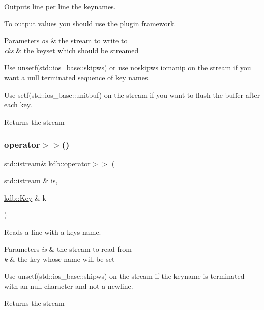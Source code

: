 Outputs line per line the keynames. 

To output values you should use the plugin framework.


\begin{DoxyParams}{Parameters}
{\em os} & the stream to write to \\
\hline
{\em cks} & the keyset which should be streamed\\
\hline
\end{DoxyParams}
Use unsetf(std\+::ios\+\_\+base\+::skipws) or use noskipws iomanip on the stream if you want a null terminated sequence of key names.

Use setf(std\+::ios\+\_\+base\+::unitbuf) on the stream if you want to flush the buffer after each key.

\begin{DoxyReturn}{Returns}
the stream 
\end{DoxyReturn}
\mbox{\label{namespacekdb_a66342865d6cdbb19075f52d92e7a61b1}} 
\subsubsection{\texorpdfstring{operator$>$$>$()}{operator>>()}\hspace{0.1cm}{\footnotesize\ttfamily [1/2]}}
{\footnotesize\ttfamily std\+::istream\& kdb\+::operator$>$$>$ (\begin{DoxyParamCaption}\item[{std\+::istream \&}]{is,  }\item[{\mbox{\hyperlink{classkdb_1_1Key}{kdb\+::\+Key}} \&}]{k }\end{DoxyParamCaption})\hspace{0.3cm}{\ttfamily [inline]}}



Reads a line with a keys name. 


\begin{DoxyParams}{Parameters}
{\em is} & the stream to read from \\
\hline
{\em k} & the key whose name will be set\\
\hline
\end{DoxyParams}
Use unsetf(std\+::ios\+\_\+base\+::skipws) on the stream if the keyname is terminated with an null character and not a newline.

\begin{DoxyReturn}{Returns}
the stream 
\end{DoxyReturn}
\mbox{\label{namespacekdb_ac4479a9f39ed65ffd251161bcaf8ea89}} 
